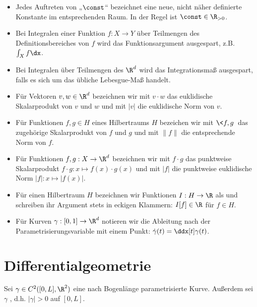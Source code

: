 \documentclass{mythesis}
\begin{document}
\begin{itemize}
    \item
	Jedes Auftreten von „$\const$“ bezeichnet eine neue, nicht näher definierte Konstante im entsprechenden Raum.
	In der Regel ist $\const \in \R_{>0}$.
    \item
	Bei Integralen einer Funktion $f: X \to Y$ über Teilmengen des Definitionsbereiches von $f$ wird das Funktionsargument ausgespart, z.B. $\int_X f \dx$.
    \item
	Bei Integralen über Teilmengen des $\R^d$ wird das Integrationsmaß ausgespart, falls es sich um das übliche Lebesgue-Maß handelt.
    \item
	Für Vektoren $v, w \in \R^d$ bezeichnen wir mit $v \cdot w$ das euklidische Skalarprodukt von $v$ und $w$ und mit $|v|$ die euklidische Norm von $v$.
    \item
	Für Funktionen $f, g \in H$ eines Hilbertraums $H$ bezeichen wir mit $\<f, g\>$ das zugehörige Skalarprodukt von $f$ und $g$ und mit $\|f\|$ die entsprechende Norm von $f$.
    \item
	Für Funktionen $f, g: X \to \R^d$ bezeichnen wir mit $f \cdot g$ das punktweise Skalarprodukt $f \cdot g: x \mapsto f(x)\cdot g(x)$ und mit $|f|$ die punktweise euklidische Norm $|f|: x \mapsto |f(x)|$.
    \item
	Für einen Hilbertraum $H$ bezeichnen wir Funktionen $I: H \to \R$ als  und schreiben ihr Argument stets in eckigen Klammern: $I[f] \in \R$ für $f \in H$.
    \item
	Für Kurven $\gamma: [0,1] \to \R^d$ notieren wir die Ableitung nach der Parametrisierungsvariable mit einem Punkt: $\dot \gamma(t) = \ddx[t] \gamma(t)$.
\end{itemize}


\section*{Differentialgeometrie}

Sei $\gamma \in C^2([0,L], \R^2)$ eine nach Bogenlänge parametrisierte Kurve.
Außerdem sei $\gamma$ , d.h. $|\gamma| > 0$ auf $[0,L]$.
\end{document}
